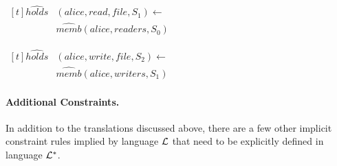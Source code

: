 \documentclass[global,twocolumn,draft]{svjour}
\newenvironment{vquote}
  {\begin{list}{}{\leftmargin 1em}\item[]}
  {\end{list}}
\begin{document}
          \begin{vquote}
            \begin{math}
              \begin{aligned}[t]
                \hat{holds}&(alice, read, file, S_{1}) \leftarrow \\
                & \hat{memb}(alice, readers, S_{0})
              \end{aligned}
            \end{math}

            \begin{math}
              \begin{aligned}[t]
                \hat{holds}&(alice, write, file, S_{2}) \leftarrow \\
                & \hat{memb}(alice, writers, S_{1})
              \end{aligned}
            \end{math}
          \end{vquote}

        \paragraph{Additional Constraints.}

          In addition to the translations discussed above, there are a few
          other implicit constraint rules implied by language ${\cal L}$
          that need to be explicitly defined in language ${\cal L}^{*}$.
\end{document}
